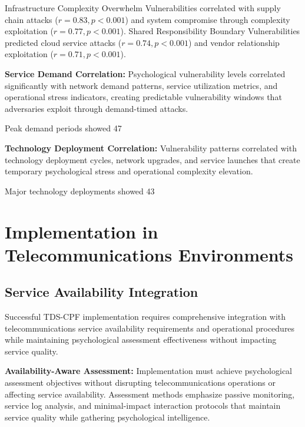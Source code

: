 \documentclass[10pt, twocolumn]{article}
\begin{document}
Infrastructure Complexity Overwhelm Vulnerabilities correlated with supply chain attacks ($r = 0.83, p < 0.001$) and system compromise through complexity exploitation ($r = 0.77, p < 0.001$). Shared Responsibility Boundary Vulnerabilities predicted cloud service attacks ($r = 0.74, p < 0.001$) and vendor relationship exploitation ($r = 0.71, p < 0.001$).

\textbf{Service Demand Correlation:} Psychological vulnerability levels correlated significantly with network demand patterns, service utilization metrics, and operational stress indicators, creating predictable vulnerability windows that adversaries exploit through demand-timed attacks.

Peak demand periods showed 47%

\textbf{Technology Deployment Correlation:} Vulnerability patterns correlated with technology deployment cycles, network upgrades, and service launches that create temporary psychological stress and operational complexity elevation.

Major technology deployments showed 43%

\section{Implementation in Telecommunications Environments}

\subsection{Service Availability Integration}

Successful TDS-CPF implementation requires comprehensive integration with telecommunications service availability requirements and operational procedures while maintaining psychological assessment effectiveness without impacting service quality.

\textbf{Availability-Aware Assessment:} Implementation must achieve psychological assessment objectives without disrupting telecommunications operations or affecting service availability. Assessment methods emphasize passive monitoring, service log analysis, and minimal-impact interaction protocols that maintain service quality while gathering psychological intelligence.
\end{document}
